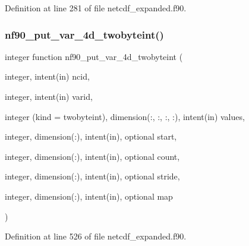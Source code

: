 Definition at line 281 of file netcdf\+\_\+expanded.\+f90.

\mbox{\label{netcdf__expanded_8f90_ad8cda8d14fae5709916706226de58236}} 
\subsubsection{\texorpdfstring{nf90\+\_\+put\+\_\+var\+\_\+4d\+\_\+twobyteint()}{nf90\_put\_var\_4d\_twobyteint()}}
{\footnotesize\ttfamily integer function nf90\+\_\+put\+\_\+var\+\_\+4d\+\_\+twobyteint (\begin{DoxyParamCaption}\item[{integer, intent(in)}]{ncid,  }\item[{integer, intent(in)}]{varid,  }\item[{integer (kind = twobyteint), dimension(\+:, \+:, \+:, \+:), intent(in)}]{values,  }\item[{integer, dimension(\+:), intent(in), optional}]{start,  }\item[{integer, dimension(\+:), intent(in), optional}]{count,  }\item[{integer, dimension(\+:), intent(in), optional}]{stride,  }\item[{integer, dimension(\+:), intent(in), optional}]{map }\end{DoxyParamCaption})}



Definition at line 526 of file netcdf\+\_\+expanded.\+f90.

\mbox{\label{netcdf__expanded_8f90_a7849510bde9b49e666c4418dc9e43aee}} 
